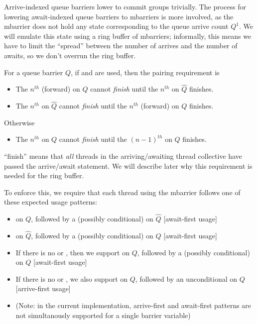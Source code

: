 \filbreak
{}

Arrive-indexed queue barriers lower to commit groups trivially.
The process for lowering await-indexed queue barriers to mbarriers is more involved, as the mbarrier does not hold any state corresponding to the queue arrive count $Q^1$.
We will emulate this state using a ring buffer of mbarriers; informally, this means we have to limit the ``spread'' between the number of arrives and the number of awaits, so we don't overrun the ring buffer.

For a  queue barrier $Q$, if  and  are used, then the pairing requirement is
\begin{itemize}
  \item The $n^{th}$ (forward)  on $Q$ cannot \textit{finish} until the $n^{th}$  on $\widehat{Q}$ finishes.
  \filbreak
  \item The $n^{th}$  on $\widehat{Q}$ cannot \textit{finish} until the $n^{th}$ (forward)  on $Q$ finishes.
\end{itemize}
\filbreak
Otherwise
\begin{itemize}
  \item The $n^{th}$  on $Q$ cannot \textit{finish} until the $(n-1)^{th}$  on $Q$ finishes.
\end{itemize}

\filbreak
``finish'' means that \textit{all} threads in the arriving/awaiting thread collective have passed the arrive/await statement.
We will describe later why this requirement is needed for the ring buffer.

\filbreak
To enforce this, we require that each thread using the mbarrier follows one of these expected usage patterns:
\begin{itemize}
  \item {} on $Q$, followed by a (possibly conditional)  on $\widehat{Q}$ [await-first usage]
  \filbreak
  \item {} on $\widehat{Q}$, followed by a (possibly conditional)  on $Q$ [await-first usage]
  \filbreak
  \item If there is no  or , then we support  on $Q$, followed by a (possibly conditional)  on $Q$ [await-first usage]
  \filbreak
  \item If there is no  or , we also support  on $Q$, followed by an unconditional  on $Q$ [arrive-first usage]
  \item (Note: in the current implementation, arrive-first and await-first patterns are not simultanously supported for a single barrier variable)
\end{itemize}


